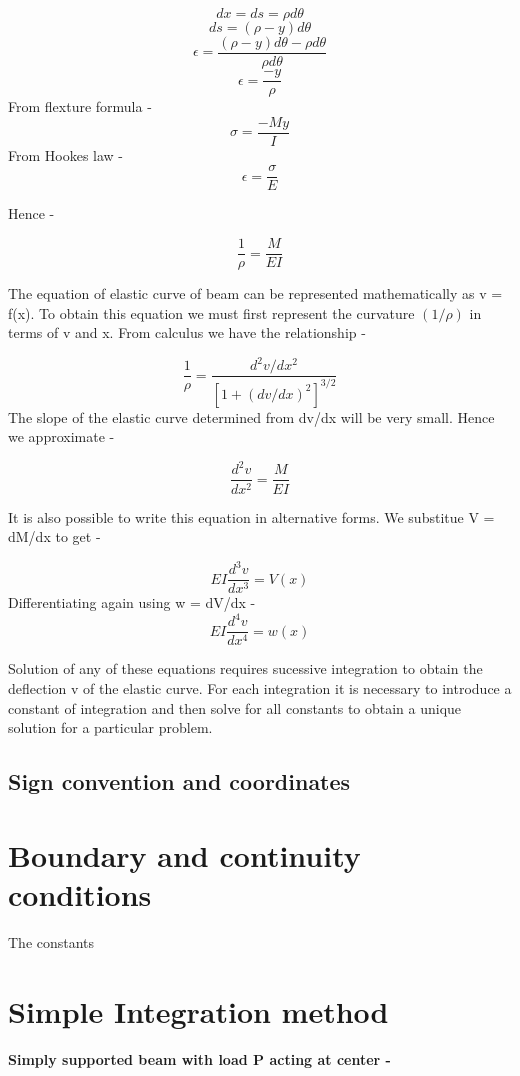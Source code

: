 \documentclass{report}
\begin{document}
\[ dx=ds= \rho d\theta \]
\[ ds = (\rho - y) d\theta\]
\[ \epsilon = \frac{(\rho - y)d\theta - \rho d\theta}{\rho d\theta} \]
\[ \epsilon = \frac{-y}{\rho} \]
From flexture formula - 
\[ \sigma =  \frac{-My}{I} \]
From Hookes law - 
\[ \epsilon = \frac{\sigma}{E}\] 

Hence - 
\begin{tcolorbox}[colback=pink!30!white, colframe=black, width=\textwidth, boxrule=0.5mm, sharp corners, left=1mm, right=1mm, top=1mm, bottom=1mm]
    \[\frac{1}{\rho} = \frac{M}{EI}\] 
\end{tcolorbox}

The equation of elastic curve of beam can be represented mathematically as v = f(x). To obtain this equation we must first represent the
curvature \((1/\rho )\) in terms of v and x. From calculus we have the relationship - 

\[ \frac{1}{\rho} = \frac{ d^2v/dx^2}{[1+ (dv/dx)^2]^{3/2}} \] 
The slope of the elastic curve determined from dv/dx will be very small. Hence we approximate - 

\[ \frac{d^2v}{dx^2} = \frac{M}{EI} \]

It is also possible to write this equation in alternative forms. We substitue V = dM/dx to get - 

\[ EI \frac{d^3v}{dx^3} = V(x)\] 
Differentiating again using w = dV/dx - 
\[ EI \frac{d^4v}{dx^4} = w(x) \]

Solution of any of these equations requires sucessive integration to
obtain the deflection v of the elastic curve. For each integration it is 
necessary to introduce a constant of integration and then solve for all 
constants to obtain a unique solution for a particular problem.

\subsection{Sign convention and coordinates}


\section{Boundary and continuity conditions}

The constants 
\section{Simple Integration method}

\textbf{Simply supported beam with load P acting at center -}\\
\end{document}
